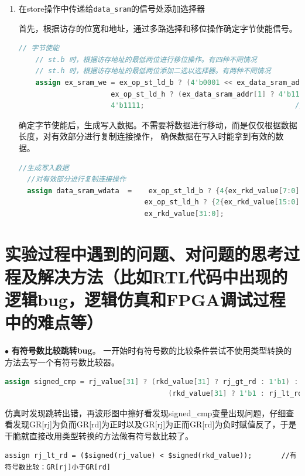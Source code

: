\documentclass[11pt]{article}
\begin{document}
\begin{enumerate}
  \item 在store操作中传递给\verb|data_sram|的信号处添加选择器
  
  首先，根据访存的位宽和地址，通过多路选择和移位操作确定字节使能信号。
  \begin{lstlisting}[language=verilog]
    // 字节使能
    // st.b 时，根据访存地址的最低两位进行移位操作。有四种不同情况
    // st.h 时，根据访存地址的最低两位添加二选以选择器。有两种不同情况
    assign ex_sram_we = ex_op_st_ld_b ? (4'b0001 << ex_data_sram_addr[1:0]) :           // st.b
                      ex_op_st_ld_h ? (ex_data_sram_addr[1] ? 4'b1100 : 4'b0011) :    // st.h
                      4'b1111;                                    // st.w
  \end{lstlisting}
  确定字节使能后，生成写入数据。不需要将数据进行移动，而是仅仅根据数据长度，对有效部分进行复制连接操作，
  确保数据在写入时能拿到有效的数据。
\begin{lstlisting}[language=verilog]
  //生成写入数据
  //对有效部分进行复制连接操作
  assign data_sram_wdata  =    ex_op_st_ld_b ? {4{ex_rkd_value[7:0]}}:
                              ex_op_st_ld_h ? {2{ex_rkd_value[15:0]}}:
                              ex_rkd_value[31:0];
\end{lstlisting}
\end{enumerate}




\vspace{1ex}

\section{实验过程中遇到的问题、对问题的思考过程及解决方法（比如RTL代码中出现的逻辑bug，逻辑仿真和FPGA调试过程中的难点等）}

\noindent
$\bullet$
\textbf{有符号数比较跳转bug}。
一开始时有符号数的比较条件尝试不使用类型转换的方法去写一个有符号数比较器。
\begin{lstlisting}[language=verilog]
 assign signed_cmp = rj_value[31] ? (rkd_value[31] ? rj_gt_rd : 1'b1) :         
                                       (rkd_value[31] ? 1'b1 : rj_lt_rd);       //有符号数比较：GR[rj]小于GR[rd]
\end{lstlisting}

仿真时发现跳转出错，再波形图中擦好看发现signed\_cmp变量出现问题，仔细查看发现GR[rj]为负而GR[rd]为正时以及GR[rj]为正而GR[rd]为负时赋值反了，于是干脆就直接改用类型转换的方法做有符号数比较了。
\begin{lstlisting}
assign rj_lt_rd = ($signed(rj_value) < $signed(rkd_value));       //有符号数比较：GR[rj]小于GR[rd]
\end{lstlisting}
\vspace{1ex}
\end{document}
